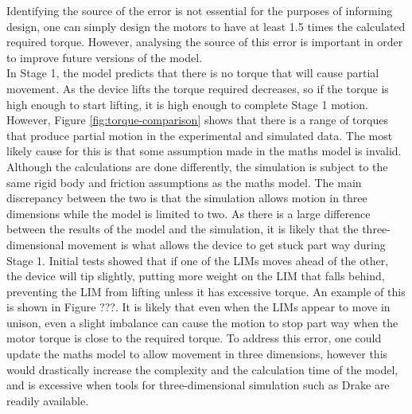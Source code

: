 Identifying the source of the error is not essential for the purposes of informing design, one can simply design the motors to have at least 1.5 times the calculated required torque. However, analysing the source of this error is important in order to improve future versions of the model.\\

In Stage 1, the model predicts that there is no torque that will cause partial movement. As the device lifts the torque required decreases, so if the torque is high enough to start lifting, it is high enough to complete Stage 1 motion. However, Figure \ref{fig:torque-comparison} shows that there is a range of torques that produce partial motion in the experimental and simulated data. The most likely cause for this is that some assumption made in the maths model is invalid. Although the calculations are done differently, the simulation is subject to the same rigid body and friction assumptions as the maths model. The main discrepancy between the two is that the simulation allows motion in three dimensions while the model is limited to two. As there is a large difference between the results of the model and the simulation, it is likely that the three-dimensional movement is what allows the device to get stuck part way during Stage 1. Initial tests showed that if one of the LIMs moves ahead of the other, the device will tip slightly, putting more weight on the LIM that falls behind, preventing the LIM from lifting unless it has excessive torque. An example of this is shown in Figure ???. It is likely that even when the LIMs appear to move in unison, even a slight imbalance can cause the motion to stop part way when the motor torque is close to the required torque. To address this error, one could update the maths model to allow movement in three dimensions, however this would drastically increase the complexity and the calculation time of the model, and is excessive when tools for three-dimensional simulation such as Drake are readily available.\\

